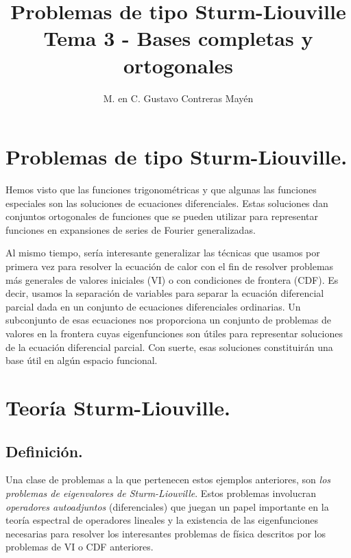 
\title{Problemas de tipo Sturm-Liouville \\ \large {Tema 3 - Bases completas y ortogonales}\vspace{-3ex}}

\author{M. en C. Gustavo Contreras Mayén}
\date{ }

\pagestyle{fancy}
\fancyhf{}
\lhead{\leftmark}
\rfoot{\thepage}
\setlength{\headheight}{16pt}%



\maketitle
\fontsize{14}{14}\selectfont
\tableofcontents
\newpage

\section{Problemas de tipo Sturm-Liouville.}

Hemos visto que las funciones trigonométricas y que algunas las funciones especiales son las soluciones de ecuaciones diferenciales. Estas soluciones dan conjuntos ortogonales de funciones que se pueden utilizar para representar funciones en expansiones de series de Fourier generalizadas.
\par
Al mismo tiempo, sería interesante generalizar las técnicas que usamos por primera vez para resolver la ecuación de calor con el fin de resolver problemas más generales de valores iniciales (VI) o con condiciones de frontera (CDF). Es decir, usamos la separación de variables para separar la ecuación diferencial parcial dada en un conjunto de ecuaciones diferenciales ordinarias. Un subconjunto de esas ecuaciones nos proporciona un conjunto de problemas de valores en la frontera cuyas eigenfunciones son útiles para representar soluciones de la ecuación diferencial parcial. Con suerte, esas soluciones constituirán una base útil en algún espacio funcional.

\section{Teoría Sturm-Liouville.}
\subsection{Definición.}

Una clase de problemas a la que pertenecen estos ejemplos anteriores, son \emph{los problemas de eigenvalores de Sturm-Liouville}. Estos problemas involucran \emph{operadores autoadjuntos} (diferenciales) que juegan un papel importante en la teoría espectral de operadores lineales y la existencia de las eigenfunciones necesarias para resolver los interesantes problemas de física descritos por los problemas de VI o CDF anteriores.

